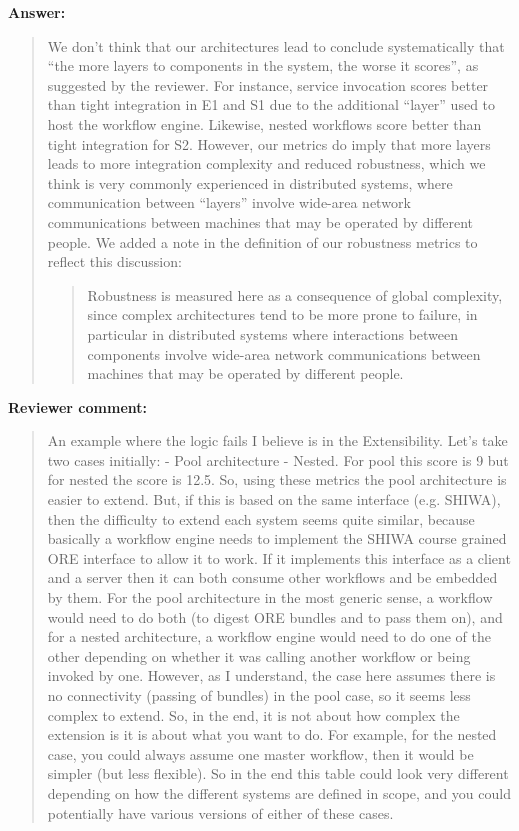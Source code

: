 \documentclass[a4]{article}
\newenvironment{review}%
{\textbf{Reviewer comment:}\begin{quote}}%
{\end{quote}}%
\newenvironment{answer}%
{\textbf{Answer:}\begin{small}\begin{quote}}%
{\end{quote}\end{small}}%
\newcommand{\revised}[1]{\color{blue} #1\color{black}\xspace}
\begin{document}
\begin{answer}
We don't think that our architectures lead to conclude systematically
that ``the more layers to components in the system, the worse it
scores'', as suggested by the reviewer. For instance, service
invocation scores better than tight integration in E1 and S1 due to
the additional ``layer'' used to host the workflow engine. Likewise,
nested workflows score better than tight integration for S2. However,
our metrics do imply that more layers leads to more integration
complexity and reduced robustness, which we think is very commonly
experienced in distributed systems, where  communication between
``layers'' involve wide-area network communications between machines
that may be operated by different people. We added a note in the definition of our robustness metrics to reflect this discussion:
\begin{quote}
 Robustness is measured here as a consequence of global
complexity, since complex architectures tend to be more prone to
failure, \revised{in particular in distributed systems where
  interactions between components involve wide-area network
  communications between machines that may be operated by different
  people}.
\end{quote}
\end{answer}

\begin{review}
An example where the logic fails I believe is in the Extensibility. Let's take two cases initially:
-	Pool architecture
-	Nested.
For pool this score is 9 but for nested the score is 12.5. So, using these metrics the pool architecture is easier to extend.  But, if this is based on the same interface (e.g. SHIWA), then the difficulty to extend each system seems quite similar, because basically a workflow engine needs to implement the SHIWA course grained ORE interface to allow it to work. If it implements this interface as a client and a server then it can both consume other workflows and be embedded by them. For the pool architecture in the most generic sense, a workflow would need to do both (to digest ORE bundles and to pass them on), and for a nested architecture, a workflow engine would need to do one of the other depending on whether it was calling another workflow or being invoked by one.  However, as I understand, the case here assumes there is no connectivity (passing of bundles) in the pool case, so it seems less complex to extend. So, in the end, it is not about how complex the extension is
it is about what you want to do.  For example, for the nested case, you could always assume one master workflow, then it would be simpler (but less flexible). So in the end this table could look very different depending on how the different systems are defined in scope, and you could potentially have various versions of either of these cases. 
\end{review}
\end{document}
